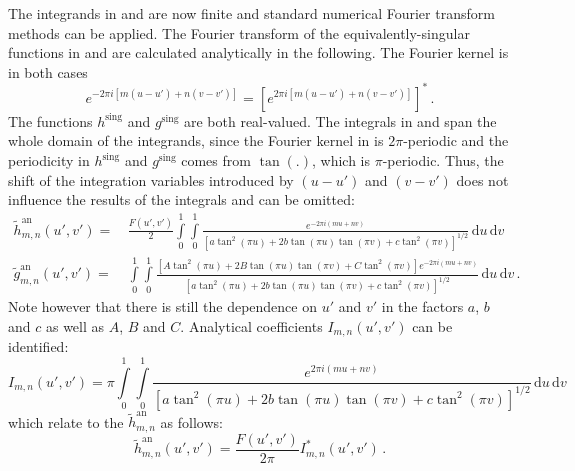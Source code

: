 The integrands in  and  are now finite and standard numerical Fourier transform methods can be applied.
%
The Fourier transform of the equivalently-singular functions in  and  are calculated analytically in the following.
The Fourier kernel is in both cases
\begin{equation}
    e^{-2 \pi i \left[m (u-u') + n (v-v')\right]}
  = \left[  e^{2 \pi i \left[m (u-u') + n (v-v')\right]} \right]^{*} \, . \label{eqn:fourier_kernel}
\end{equation}
The functions $h^\mathrm{sing}$ and $g^\mathrm{sing}$ are both real-valued.
The integrals in  and  span the whole domain of the integrands,
since the Fourier kernel in  is $2\pi$-periodic and the periodicity in $h^\mathrm{sing}$ and $g^\mathrm{sing}$
comes from $\tan(.)$, which is $\pi$-periodic.
Thus, the shift of the integration variables introduced by $(u-u')$ and $(v-v')$
does not influence the results of the integrals and can be omitted:
\begin{align}
  \tilde{h}^\mathrm{an}_{m,n}(u',v')
  =&\, \frac{F(u',v')}{2}
     \int\limits_0^1 \int\limits_0^1
       \frac{e^{-2 \pi i (m u + n v)}}
            {\left[ a \tan^2(\pi u) + 2 b \tan(\pi u) \tan(\pi v) + c \tan^2(\pi v) \right]^{1/2}}
     \,\mathrm{d}u \,\mathrm{d}v \\
  \tilde{g}^\mathrm{an}_{m,n}(u',v')
  =&\, \int\limits_0^1 \int\limits_0^1
       \frac{\left[A \tan^2(\pi u) + 2 B \tan(\pi u) \tan(\pi v) + C \tan^2(\pi v) \right] e^{-2 \pi i (m u + n v)}}
            {\left[a \tan^2(\pi u) + 2 b \tan(\pi u) \tan(\pi v) + c \tan^2(\pi v) \right]^{1/2}                   }
     \,\mathrm{d}u \,\mathrm{d}v \, .
\end{align}
Note however that there is still the dependence on $u'$ and $v'$ in the factors $a$, $b$ and $c$ as well as $A$, $B$ and $C$.
Analytical coefficients $I_{m,n}(u',v')$ can be identified:
\begin{equation}
  I_{m,n}(u',v')
  = \pi \int\limits_0^1 \int\limits_0^1
       \frac{e^{2 \pi i (m u + n v)}}
            {\left[ a \tan^2(\pi u) + 2 b \tan(\pi u) \tan(\pi v) + c \tan^2(\pi v) \right]^{1/2}}
     \,\mathrm{d}u \,\mathrm{d}v \label{eqn:def_Imn}
\end{equation}
which relate to the $\tilde{h}^\mathrm{an}_{m,n}$ as follows:
\begin{equation}
  \tilde{h}^\mathrm{an}_{m,n} (u',v')
  = \frac{F(u',v')}{2 \pi} I_{m,n}^{*}(u',v') \, .
\end{equation}
